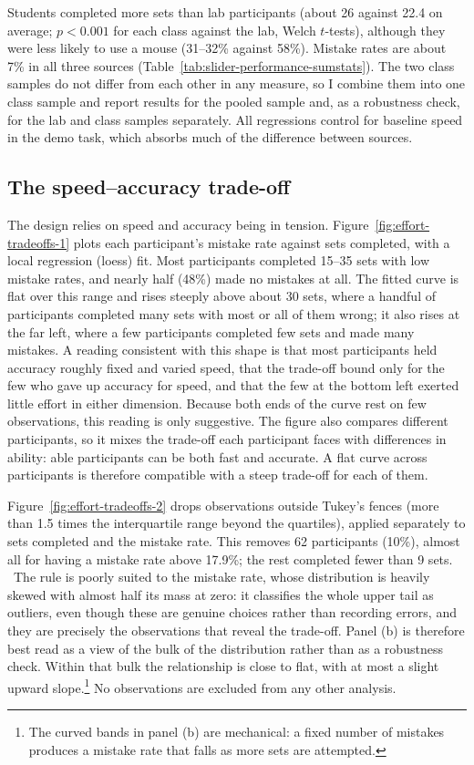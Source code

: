 \documentclass[12pt, letterpaper]{article}
\begin{document}
Students completed more sets than lab participants (about 26 against 22.4 on average; $p < 0.001$ for each class against the lab, Welch $t$-tests), although they were less likely to use a mouse (31--32\% against 58\%). Mistake rates are about 7\% in all three sources (Table~\ref{tab:slider-performance-sumstats}). The two class samples do not differ from each other in any measure, so I combine them into one class sample and report results for the pooled sample and, as a robustness check, for the lab and class samples separately. All regressions control for baseline speed in the demo task, which absorbs much of the difference between sources.

\subsection{The speed--accuracy trade-off}

The design relies on speed and accuracy being in tension. Figure~\ref{fig:effort-tradeoffs-1} plots each participant's mistake rate against sets completed, with a local regression (loess) fit. Most participants completed 15--35 sets with low mistake rates, and nearly half (48\%) made no mistakes at all. The fitted curve is flat over this range and rises steeply above about 30 sets, where a handful of participants completed many sets with most or all of them wrong; it also rises at the far left, where a few participants completed few sets and made many mistakes. A reading consistent with this shape is that most participants held accuracy roughly fixed and varied speed, that the trade-off bound only for the few who gave up accuracy for speed, and that the few at the bottom left exerted little effort in either dimension. Because both ends of the curve rest on few observations, this reading is only suggestive. The figure also compares different participants, so it mixes the trade-off each participant faces with differences in ability: able participants can be both fast and accurate. A flat curve across participants is therefore compatible with a steep trade-off for each of them.

Figure~\ref{fig:effort-tradeoffs-2} drops observations outside Tukey's fences (more than 1.5 times the interquartile range beyond the quartiles), applied separately to sets completed and the mistake rate. This removes 62 participants (10\%), almost all for having a mistake rate above 17.9\%; the rest completed fewer than 9 sets.%
\ The rule is poorly suited to the mistake rate, whose distribution is heavily skewed with almost half its mass at zero: it classifies the whole upper tail as outliers, even though these are genuine choices rather than recording errors, and they are precisely the observations that reveal the trade-off. Panel (b) is therefore best read as a view of the bulk of the distribution rather than as a robustness check. Within that bulk the relationship is close to flat, with at most a slight upward slope.\footnote{The curved bands in panel (b) are mechanical: a fixed number of mistakes produces a mistake rate that falls as more sets are attempted.} No observations are excluded from any other analysis.
\end{document}
